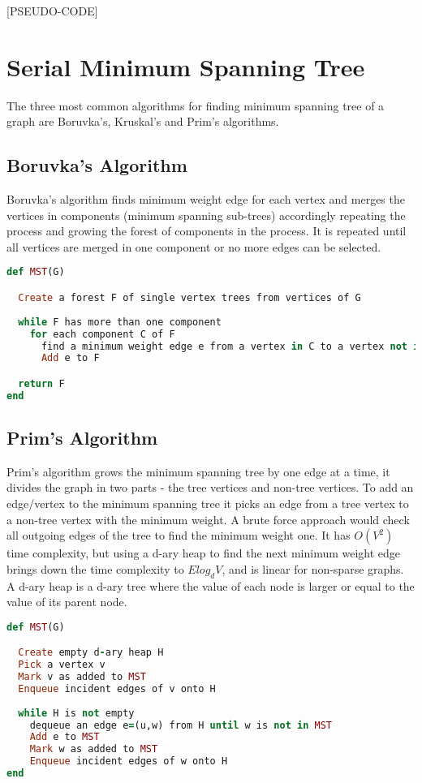\documentclass{report}
\theoremstyle{plain}
\theoremstyle{definition}
\theoremstyle{remark}
\begin{document}
[PSEUDO-CODE]

\section{Serial Minimum Spanning Tree}

The three most common algorithms for finding minimum spanning tree of a graph are Boruvka's, Kruskal's and Prim's algorithms.

\subsection*{Boruvka's Algorithm}

Boruvka's algorithm finds minimum weight edge for each vertex and merges the vertices in components (minimum spanning sub-trees) accordingly repeating the process and growing the forest of components in the process. It is repeated until all vertices are merged in one component or no more edges can be selected.

\begin{lstlisting}[language=Ruby, mathescape]
def MST(G)

  Create a forest F of single vertex trees from vertices of G
  
  while F has more than one component
    for each component C of F
      find a minimum weight edge e from a vertex in C to a vertex not in C
      Add e to F

  return F
end
\end{lstlisting}

\subsection*{Prim's Algorithm}
Prim's algorithm grows the minimum spanning tree by one edge at a time, it divides the graph in two parts - the tree vertices and non-tree vertices. To add an edge/vertex to the minimum spanning tree it picks an edge from a tree vertex to a non-tree vertex with the minimum weight. A brute force approach would check all outgoing edges of the tree to find the minimum weight one. It has $O(V^2)$ time complexity, but using a d-ary heap to find the next minimum weight edge brings down the time complexity to $Elog_dV$, and is linear for non-sparse graphs. A d-ary heap is a d-ary tree where the value of each node is larger or equal to the value of its parent node.

\begin{lstlisting}[language=Ruby]
def MST(G)

  Create empty d-ary heap H
  Pick a vertex v
  Mark v as added to MST
  Enqueue incident edges of v onto H
  
  while H is not empty
    dequeue an edge e=(u,w) from H until w is not in MST
    Add e to MST
    Mark w as added to MST
    Enqueue incident edges of w onto H
end
\end{lstlisting}
\end{document}
